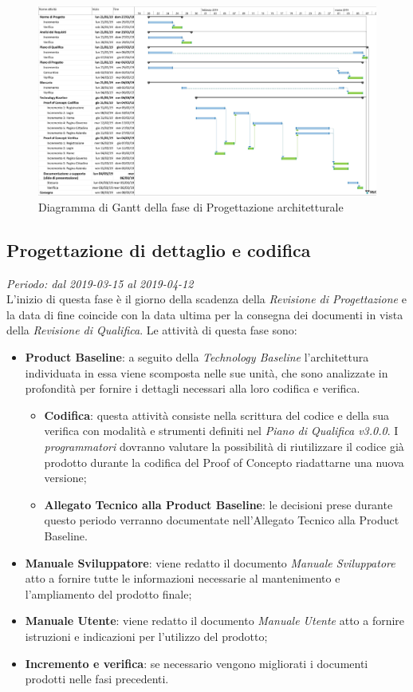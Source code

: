 \begin{figure}[H]
	\includegraphics[width=0.99\linewidth]{res/images/gantt_pa.jpg}
	\caption{Diagramma di Gantt della fase di Progettazione architetturale}
\end{figure}


\subsection{Progettazione di dettaglio e codifica}
\textit{Periodo: dal 2019-03-15 al 2019-04-12} \\
L'inizio di questa fase è il giorno della scadenza della \textit{Revisione di 
Progettazione} e la data di fine coincide con la data ultima per la consegna dei documenti 
in vista della \textit{Revisione di Qualifica}. Le attività di questa fase sono:
\begin{itemize}
	\item \textbf{Product Baseline}: a seguito della \textit{Technology 
	Baseline} l'architettura individuata in essa viene scomposta nelle sue unità,
	che sono analizzate in profondità per fornire i dettagli necessari alla loro codifica e verifica. 
	\begin{itemize}
		\item \textbf{Codifica}: questa attività consiste nella scrittura del 
		codice e della sua verifica con modalità e strumenti definiti nel 
		\textit{Piano di Qualifica v3.0.0}. I \textit{programmatori} dovranno valutare
		la possibilità di riutilizzare il codice già prodotto durante la codifica del 
		Proof of Concept\glosp o riadattarne una nuova versione;
		\item \textbf{Allegato Tecnico alla Product Baseline}: le decisioni prese 
		durante questo periodo verranno documentate nell'Allegato Tecnico alla Product Baseline.
	\end{itemize}
	\item \textbf{Manuale Sviluppatore}: viene redatto il documento \textit{Manuale 
	Sviluppatore} atto a fornire tutte le informazioni necessarie al mantenimento e 
	l'ampliamento del prodotto finale;
	\item \textbf{Manuale Utente}: viene redatto il documento \textit{Manuale 
	Utente} atto a fornire istruzioni e indicazioni per l'utilizzo del prodotto;
	\item \textbf{Incremento e verifica}: se necessario vengono migliorati i 
	documenti prodotti nelle fasi precedenti.
\end{itemize}

